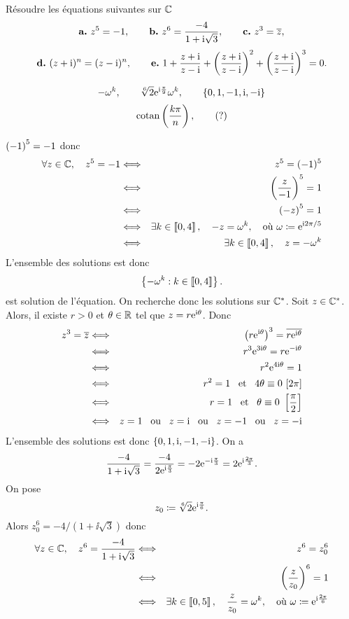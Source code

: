 \documentclass{magnolia}
\begin{document}
Résoudre les équations suivantes sur $\mathbb{C}$
$$\textbf{a.}\ z^5=-1, \qquad \textbf{b.}\ z^6=\frac{-4}{1+\ii\sqrt{3}}, \qquad \textbf{c.}\ z^3=\conj{z},$$
$$\textbf{d.}\ (z+\ii)^n=(z-\ii)^n, \qquad\textbf{e.}\ 
  1+\frac{z+\ii}{z-\ii}+\p{\frac{z+\ii}{z-\ii}}^2+\p{\frac{z+\ii}{z-\ii}}^3=0.$$
\begin{sol}
\[-\omega^k, \qquad \sqrt[6]{2}{\rm e}^{{\rm i}\frac{\pi}{9}}\omega^k, \qquad \left\{0,1,-1,{\rm i},-{\rm i}\right\}\]
\[\operatorname{cotan}\left(\frac{k\pi}{n}\right), \qquad (?)\] 
\begin{questions}
\question $\left(-1\right)^5=-1$ donc
  \begin{eqnarray*}
\forall z\in\mathbb{C},\quad z^5=-1
&\Longleftrightarrow& z^5=(-1)^5\\
&\Longleftrightarrow& \left(\frac{z}{-1}\right)^5=1\\
&\Longleftrightarrow& \left(-z\right)^5=1\\
&\Longleftrightarrow& \exists k\in\left\llbracket 0,4\right\rrbracket,\quad -z=\omega^k, \quad\text{où $\omega\coloneqq{\rm e}^{{\rm i} 2\pi/5}$}\\
&\Longleftrightarrow& \exists k\in\left\llbracket 0,4\right\rrbracket,\quad z=-\omega^k
\end{eqnarray*}
L'ensemble des solutions est donc
\[\left\{-\omega^k : k\in\left\llbracket 0,4\right\rrbracket\right\}.\]
 est solution de l'équation. On recherche donc les solutions sur $\mathbb{C}^*$. Soit $z\in\mathbb{C}^*$. Alors, il existe $r>0$ et $\theta\in\mathbb{R}$ tel que $z=r{\rm e}^{{\rm i}\theta}$. Donc
  \begin{eqnarray*}
z^3=\conj{z}
&\ssi& \p{r\e^{\ii\theta}}^3=\conj{r\e^{\ii\theta}}\\
&\ssi& r^3 \e^{3\ii\theta}=r\e^{-\ii\theta}\\
&\ssi& r^2 \e^{4\ii\theta}=1\\
&\ssi& r^2=1 \et 4\theta\equiv 0\ [2\pi]\\
&\ssi& r=1 \et \theta\equiv 0\ \cro{\frac{\pi}{2}}\\
&\ssi& z=1 \ou z=\ii \ou z=-1 \ou z=-\ii
  \end{eqnarray*}
L'ensemble des solutions est donc $\left\{0,1,{\rm i},-1,-{\rm i}\right\}$.
\question On a
  \[\frac{-4}{1+{\rm i}\sqrt{3}}=\frac{-4}{2{\rm e}^{{\rm i} \frac{\pi}{3}}}=-2{\rm e}^{-{\rm i}\frac{\pi}{3}}=2{\rm e}^{{\rm i}\frac{2\pi}{3}}.\]
  On pose
  \[z_0\coloneqq\sqrt[6]{2}{\rm e}^{{\rm i}\frac{\pi}{6}}.\]
  Alors $z_0^6=-4/(1+\ii\sqrt{3})$ donc
  \begin{eqnarray*}
  \forall z\in\C\qsep z^6=\frac{-4}{1+\ii\sqrt{3}}
  &\ssi& z^6 = z_0^6\\
  &\ssi& \p{\frac{z}{z_0}}^6 = 1\\
  &\ssi& \exists k\in\intere{0}{5}\qsep \frac{z}{z_0}=\omega^k, \quad\text{où $\omega\defeq\e^{\ii\frac{2\pi}{6}}$}\\

\end{eqnarray*}
\end{questions}
\end{sol}
\end{document}
